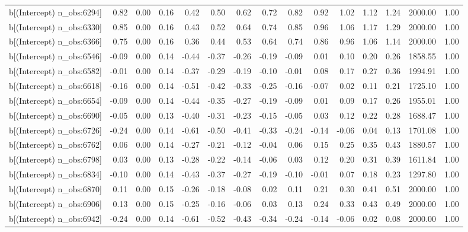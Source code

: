 \begin{table}[ht]
\begin{tabular}{rrrrrrrrrrrrrrr}
  b[(Intercept) n\_obs:6294] & 0.82 & 0.00 & 0.16 & 0.42 & 0.50 & 0.62 & 0.72 & 0.82 & 0.92 & 1.02 & 1.12 & 1.24 & 2000.00 & 1.00 \\ 
  b[(Intercept) n\_obs:6330] & 0.85 & 0.00 & 0.16 & 0.43 & 0.52 & 0.64 & 0.74 & 0.85 & 0.96 & 1.06 & 1.17 & 1.29 & 2000.00 & 1.00 \\ 
  b[(Intercept) n\_obs:6366] & 0.75 & 0.00 & 0.16 & 0.36 & 0.44 & 0.53 & 0.64 & 0.74 & 0.86 & 0.96 & 1.06 & 1.14 & 2000.00 & 1.00 \\ 
  b[(Intercept) n\_obs:6546] & -0.09 & 0.00 & 0.14 & -0.44 & -0.37 & -0.26 & -0.19 & -0.09 & 0.01 & 0.10 & 0.20 & 0.26 & 1858.55 & 1.00 \\ 
  b[(Intercept) n\_obs:6582] & -0.01 & 0.00 & 0.14 & -0.37 & -0.29 & -0.19 & -0.10 & -0.01 & 0.08 & 0.17 & 0.27 & 0.36 & 1994.91 & 1.00 \\ 
  b[(Intercept) n\_obs:6618] & -0.16 & 0.00 & 0.14 & -0.51 & -0.42 & -0.33 & -0.25 & -0.16 & -0.07 & 0.02 & 0.11 & 0.21 & 1725.10 & 1.00 \\ 
  b[(Intercept) n\_obs:6654] & -0.09 & 0.00 & 0.14 & -0.44 & -0.35 & -0.27 & -0.19 & -0.09 & 0.01 & 0.09 & 0.17 & 0.26 & 1955.01 & 1.00 \\ 
  b[(Intercept) n\_obs:6690] & -0.05 & 0.00 & 0.13 & -0.40 & -0.31 & -0.23 & -0.15 & -0.05 & 0.03 & 0.12 & 0.22 & 0.28 & 1688.47 & 1.00 \\ 
  b[(Intercept) n\_obs:6726] & -0.24 & 0.00 & 0.14 & -0.61 & -0.50 & -0.41 & -0.33 & -0.24 & -0.14 & -0.06 & 0.04 & 0.13 & 1701.08 & 1.00 \\ 
  b[(Intercept) n\_obs:6762] & 0.06 & 0.00 & 0.14 & -0.27 & -0.21 & -0.12 & -0.04 & 0.06 & 0.15 & 0.25 & 0.35 & 0.43 & 1880.57 & 1.00 \\ 
  b[(Intercept) n\_obs:6798] & 0.03 & 0.00 & 0.13 & -0.28 & -0.22 & -0.14 & -0.06 & 0.03 & 0.12 & 0.20 & 0.31 & 0.39 & 1611.84 & 1.00 \\ 
  b[(Intercept) n\_obs:6834] & -0.10 & 0.00 & 0.14 & -0.43 & -0.37 & -0.27 & -0.19 & -0.10 & -0.01 & 0.07 & 0.18 & 0.23 & 1297.80 & 1.00 \\ 
  b[(Intercept) n\_obs:6870] & 0.11 & 0.00 & 0.15 & -0.26 & -0.18 & -0.08 & 0.02 & 0.11 & 0.21 & 0.30 & 0.41 & 0.51 & 2000.00 & 1.00 \\ 
  b[(Intercept) n\_obs:6906] & 0.13 & 0.00 & 0.15 & -0.25 & -0.16 & -0.06 & 0.03 & 0.13 & 0.24 & 0.33 & 0.43 & 0.49 & 2000.00 & 1.00 \\ 
  b[(Intercept) n\_obs:6942] & -0.24 & 0.00 & 0.14 & -0.61 & -0.52 & -0.43 & -0.34 & -0.24 & -0.14 & -0.06 & 0.02 & 0.08 & 2000.00 & 1.00 \\ 

\end{tabular}
\end{table}
